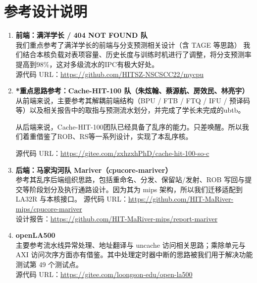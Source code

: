 \section{参考设计说明}

\begin{enumerate}
  \item \textbf{前端：满洋学长 / 404 NOT FOUND 队}\\
  我们重点参考了满洋学长的前端与分支预测相关设计（含 TAGE 等思路）
  我们结合本核负载对表项容量、历史长度与训练时机进行了调整，将分支预测率提高到98\%，这对多级流水的IPC有极大好处。\\
  源代码 URL：\url{https://github.com/HITSZ-NSCSCC22/mycpu}

  \item \textbf{*重点思路参考：Cache-HIT-100 队（朱炫翰、蔡源航、房效民、林亮宇）}\\
  从前端来说，主要参考其解耦前端结构（BPU / FTB / FTQ / IFU / 预译码等）以及相关报告中的取指与预测流水划分，并完成了学长未完成的ubtb。
  
  
  从后端来说，Cache-HIT-100团队已经具备了乱序的能力。只差唤醒。所以我们着重借鉴了ROB、RS等一系列设计，实现了本乱序核。
  
  
  源代码 URL：\url{https://gitee.com/zxhzxhPhD/cache-hit-100-so-c}
  

  \item \textbf{后端：马家沟河队 Mariver（cpucore-mariver）}\\
  参考其乱序后端组织思路，包括重命名、分发、保留站/发射、ROB 写回与提交等阶段划分及执行通路设计。因为其为 mips 架构，所以我们迁移适配到 LA32R 与本核接口。
  源代码 URL：\url{https://github.com/HIT-MaRiver-mips/cpucore-mariver}\\
  设计报告：\url{https://github.com/HIT-MaRiver-mips/report-mariver}

  \item \textbf{openLA500}\\
  主要参考流水线异常处理、地址翻译与 uncache 访问相关思路；乘除单元与 AXI 访问次序方面亦有借鉴。其中处理定时器中断的思路被我们用于解决功能测试第 49 个测试点。\\
  源代码 URL：\url{https://gitee.com/loongson-edu/open-la500}
  
  

\end{enumerate}
